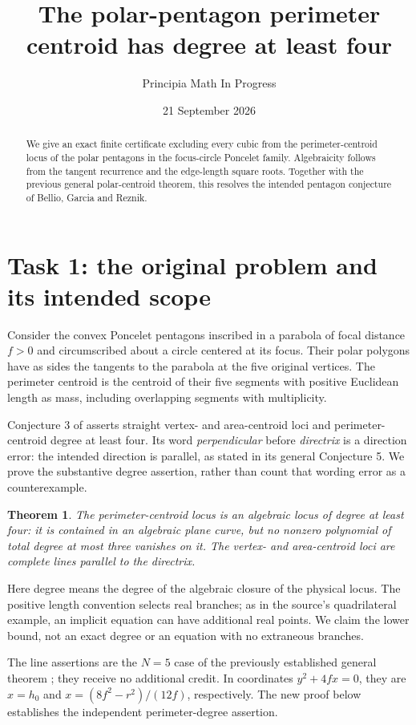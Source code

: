 \documentclass[11pt]{article}
\title{The polar-pentagon perimeter centroid has degree at least four}
\author{Principia Math In Progress}
\date{21 September 2026}
\newtheorem{theorem}{Theorem}
\begin{document}
\maketitle
\begin{abstract}
We give an exact finite certificate excluding every cubic from the
perimeter-centroid locus of the polar pentagons in the
focus-circle Poncelet family. Algebraicity follows from the tangent
recurrence and the edge-length square roots. Together with the
previous general polar-centroid theorem, this resolves the intended
pentagon conjecture of Bellio, Garcia and Reznik.
\end{abstract}

\section*{Task 1: the original problem and its intended scope}
Consider the convex Poncelet pentagons inscribed in a parabola of
focal distance $f>0$ and circumscribed about a circle centered at its
focus. Their polar polygons have as sides the tangents to the
parabola at the five original vertices. The perimeter centroid is
the centroid of their five segments with positive Euclidean
length as mass, including overlapping segments with multiplicity.

Conjecture 3 of \cite{BGR} asserts straight vertex- and area-centroid
loci and perimeter-centroid degree at least four. Its word
\emph{perpendicular} before \emph{directrix} is a direction error:
the intended direction is parallel, as stated in its general
Conjecture 5. We prove the substantive degree assertion, rather
than count that wording error as a counterexample.

\begin{theorem}
The perimeter-centroid locus is an algebraic locus of degree at
least four: it is contained in an algebraic plane curve, but no
nonzero polynomial of total degree at most three vanishes on it.
The vertex- and area-centroid loci are complete lines parallel
to the directrix.
\end{theorem}
Here degree means the degree of the algebraic closure of the
physical locus. The positive length convention selects real
branches; as in the source's quadrilateral example, an implicit
equation can have additional real points. We claim the lower bound,
not an exact degree or an equation with no extraneous branches.

The line assertions are the $N=5$ case of the previously established
general theorem \cite{polar}; they receive no additional credit.
In coordinates $y^2+4fx=0$, they are $x=h_0$ and
$x=(8f^2-r^2)/(12f)$, respectively. The new proof below establishes
the independent perimeter-degree assertion.
\end{document}
